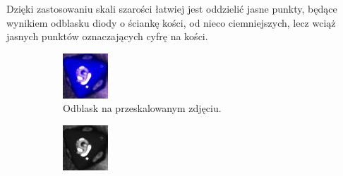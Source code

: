 Dzięki zastosowaniu skali szarości łatwiej jest oddzielić jasne punkty, będące wynikiem odblasku diody o ściankę kości,
od nieco ciemniejszych, lecz wciąż jasnych punktów oznaczających cyfrę na kości.

\begin{figure}[H]
    \centering
    \begin{subfigure}[t]{0.45\linewidth}
        \centering
        \includegraphics[width=\linewidth]{chapters/04-czytanie/figures/blask_raw}
        \caption{Odblask na przeskalowanym zdjęciu.}
        \label{fig:blaskraw}
    \end{subfigure}
    \hfill
    \begin{subfigure}[t]{0.45\linewidth}
        \centering
        \includegraphics[width=\linewidth]{chapters/04-czytanie/figures/blask_proc}

\end{subfigure}
\end{figure}

